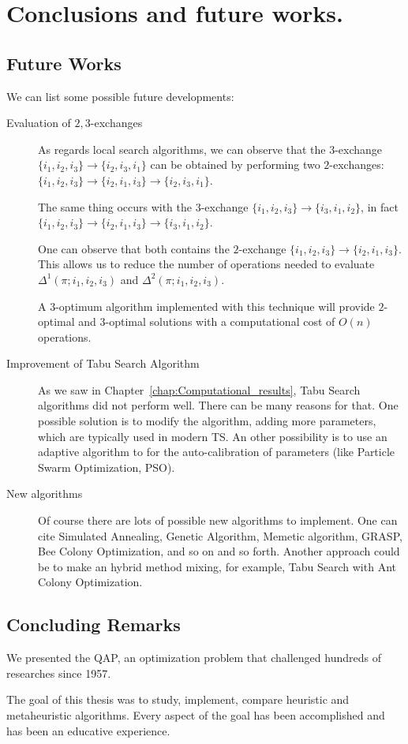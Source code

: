 \chapter{Conclusions and future works.}
\label{chap:Conclusions}

\section{Future Works}
We can list some possible future developments:

\begin{description}
	\item[Evaluation of $2,3$-exchanges]
	As regards local search algorithms, we can observe that the $3$-exchange \footnotesize $\{i_1,i_2,i_3\}\to\{i_2,i_3,i_1\}$ \normalsize can be obtained by performing two $2$-exchanges: \footnotesize$\{i_1,i_2,i_3\}\to \{i_2,i_1,i_3\}\to \{i_2,i_3,i_1\}$\normalsize. 
	
	The same thing occurs with the $3$-exchange \footnotesize$\{i_1,i_2,i_3\}\to\{i_3,i_1,i_2\}$\normalsize, in fact \footnotesize$\{i_1,i_2,i_3\}\to \{i_2,i_1,i_3\}\to \{i_3,i_1,i_2\}$\normalsize.
	
	One can observe that both contains the $2$-exchange \footnotesize $\{i_1,i_2,i_3\}\to\{i_2,i_1,i_3\}$\normalsize. This allows us to reduce the number of operations needed to evaluate $\Delta^1(\pi;i_1,i_2,i_3)$ and  $\Delta^2(\pi;i_1,i_2,i_3)$. 
	
	A $3$-optimum algorithm implemented with this technique will provide $2$-optimal and $3$-optimal solutions with a computational cost of $O(n)$ operations.
	
\item[Improvement of Tabu Search Algorithm]	As we saw in Chapter~\ref{chap:Computational_results}, Tabu Search algorithms did not perform well. There can be many reasons for that. One possible solution is to modify the algorithm, adding more parameters, which are typically used in modern TS. An other possibility is to use an adaptive algorithm to for the auto-calibration of parameters (like Particle Swarm Optimization, PSO). 

\item[New algorithms] Of course there are lots of possible new algorithms to implement. One can cite Simulated Annealing, Genetic Algorithm, Memetic algorithm, GRASP, Bee Colony Optimization, and so on and so forth. Another approach could be to make an hybrid method mixing, for example, Tabu Search with Ant Colony Optimization.



\end{description}

\section{Concluding Remarks}

We presented the QAP, an optimization problem that challenged hundreds of researches since 1957. 

The goal of this thesis was to study, implement, compare heuristic and metaheuristic algorithms. Every aspect of the goal has been accomplished and has been an educative experience.